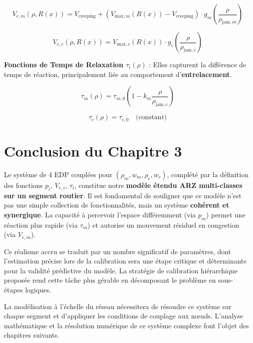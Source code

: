 \begin{equation}
V_{e,m}(\rho, R(x)) = V_{\text{creeping}} + \left(V_{\text{max},m}(R(x)) - V_{\text{creeping}}\right) \cdot g_m\left(\frac{\rho}{\rho_{\text{jam},m}}\right)
\end{equation}

\begin{equation}
V_{e,c}(\rho, R(x)) = V_{\text{max},c}(R(x)) \cdot g_c\left(\frac{\rho}{\rho_{\text{jam},c}}\right)
\end{equation}

\textbf{Fonctions de Temps de Relaxation $\tau_i(\rho)$} : Elles capturent la différence de temps de réaction, principalement liée au comportement d'\textbf{entrelacement}.

\begin{equation}
\tau_m(\rho) = \tau_{m,0} \left(1 - k_m \frac{\rho}{\rho_{\text{jam},c}}\right)
\end{equation}

\begin{equation}
\tau_c(\rho) = \tau_{c,0} \quad \text{(constant)}
\end{equation}

\section{Conclusion du Chapitre 3}
Le système de 4 EDP couplées pour $(\rho_m, w_m, \rho_c, w_c)$, complété par la définition des fonctions $p_i$, $V_{e,i}$, $\tau_i$, constitue notre \textbf{modèle étendu ARZ multi-classes sur un segment routier}. Il est fondamental de souligner que ce modèle n'est pas une simple collection de fonctionnalités, mais un système \textbf{cohérent et synergique}. La capacité à percevoir l'espace différemment (via $p_m$) permet une réaction plus rapide (via $\tau_m$) et autorise un mouvement résiduel en congestion (via $V_{e,m}$).

Ce réalisme accru se traduit par un nombre significatif de paramètres, dont l'estimation précise lors de la calibration sera une étape critique et déterminante pour la validité prédictive du modèle. La stratégie de calibration hiérarchique proposée rend cette tâche plus gérable en décomposant le problème en sous-étapes logiques.

La modélisation à l'échelle du réseau nécessitera de résoudre ce système sur chaque segment et d'appliquer les conditions de couplage aux nœuds. L'analyse mathématique et la résolution numérique de ce système complexe font l'objet des chapitres suivants.